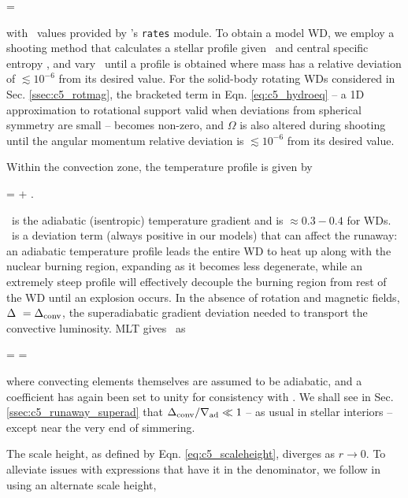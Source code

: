 \eqbegin
{} = \epscc
\label{eq:c5_dldm}
\eqend

\noindent with \epscc\ values provided by \mesa's \texttt{rates} module.  To obtain a model WD, we employ a shooting method that calculates a stellar profile given \rhoc\ and central specific entropy \Sc, and vary \rhoc\ until a profile is obtained where mass has a relative deviation of $\lesssim 10^{-6}$ from its desired value.  For the solid-body rotating WDs considered in Sec. \ref{ssec:c5_rotmag}, the bracketed term in Eqn. \ref{eq:c5_hydroeq} -- a 1D approximation to rotational support valid when deviations from spherical symmetry are small -- becomes non-zero, and $\Omega$ is also altered during shooting until the angular momentum relative deviation is $\lesssim 10^{-6}$ from its desired value.

Within the convection zone, the temperature profile is given by

\eqbegin
\nabla \equiv {} = \nablaad + \deltanab.
\label{eq:c5_tempgrad}
\eqend

\noindent \nablaad\ is the adiabatic (isentropic) temperature gradient and is $\approx 0.3 -  0.4$ for WDs.  \deltanab\ is a deviation term (always positive in our models) that can affect the runaway: an adiabatic temperature profile leads the entire WD to heat up along with the nuclear burning region, expanding as it becomes less degenerate, while an extremely steep profile will effectively decouple the burning region from rest of the WD until an explosion occurs.  In the absence of rotation and magnetic fields, $\deltanab\ = \dnabconv$, the superadiabatic gradient deviation needed to transport the convective luminosity.  MLT gives \dnabconv\ as

\eqbegin
\dnabconv =  = 
\label{eq:c5_superad_dev}
\eqend

\noindent where {\charles convecting elements themselves are assumed to be adiabatic}, and a coefficient has again been set to unity for consistency with \citeal{piroc08}.  We shall see in Sec. \ref{ssec:c5_runaway_superad} that $\dnabconv/\nablaad \ll 1$ -- as usual in stellar interiors -- except near the very end of simmering.

The scale height, as defined by Eqn. \ref{eq:c5_scaleheight}, diverges as $r\rightarrow0$.  To alleviate issues with expressions that have it in the denominator, we follow \cite{paxt+11} in using an alternate scale height,

